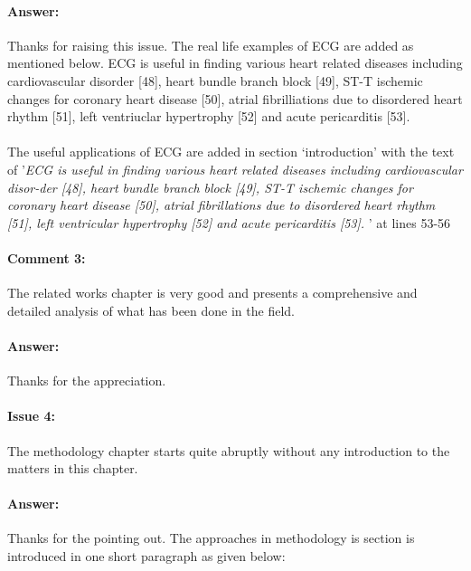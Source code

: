 \documentclass{article}
\begin{document}
\paragraph{Answer:}
Thanks for raising this issue. The real life examples of ECG are added as mentioned below.
ECG is useful in finding various heart related diseases including cardiovascular disorder [48], heart bundle branch block [49], ST-T ischemic changes for coronary heart disease [50], atrial fibrilliations due to disordered heart rhythm [51], left ventriuclar hypertrophy [52] and acute pericarditis [53]. \\\\

The useful applications of ECG are added in section `introduction' with the text of '\textit{ECG is useful in finding various heart related diseases including cardiovascular disor-der [48], heart bundle branch block [49], ST-T ischemic changes for coronary heart disease [50], atrial fibrillations due to disordered heart rhythm [51], left ventricular hypertrophy [52] and acute pericarditis [53]. }' at lines 53-56

\paragraph{Comment 3:}
\begin{displayquote}
The related works chapter is very good and presents a comprehensive and detailed analysis of what has been done in the field.
\end{displayquote}

\paragraph{Answer:}
Thanks for the appreciation.

\paragraph{Issue 4:}
\begin{displayquote}
The methodology chapter starts quite abruptly without any introduction to the matters in this chapter.
\end{displayquote}

\paragraph{Answer:}
Thanks for the pointing out. The approaches in methodology is section is introduced in one short paragraph as given below:
\end{document}
